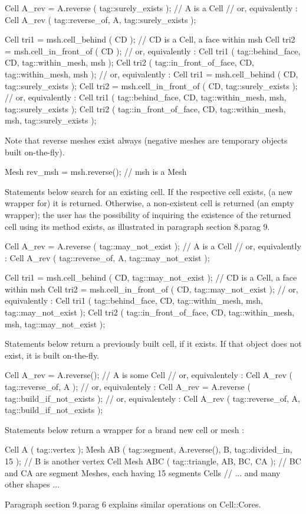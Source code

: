 \verbatim
   Cell A_rev = A.reverse ( tag::surely_exists );  //  A is a Cell
   // or, equivalently :
   Cell A_rev ( tag::reverse_of, A, tag::surely_exists );

   Cell tri1 = msh.cell_behind ( CD );  //  CD is a Cell, a face within msh
   Cell tri2 = msh.cell_in_front_of ( CD );
   // or, equivalently :
   Cell tri1 ( tag::behind_face, CD, tag::within_mesh, msh );
   Cell tri2 ( tag::in_front_of_face, CD, tag::within_mesh, msh );
   // or, equivalently :
   Cell tri1 = msh.cell_behind ( CD, tag::surely_exists );
   Cell tri2 = msh.cell_in_front_of ( CD, tag::surely_exists );
   // or, equivalently :
   Cell tri1 ( tag::behind_face, CD, tag::within_mesh, msh, tag::surely_exists );
   Cell tri2 ( tag::in_front_of_face, CD,
               tag::within_mesh, msh, tag::surely_exists );
\endverbatim

Note that reverse meshes exist always (negative meshes are temporary objects built
on-the-fly).

\verbatim
   Mesh rev_msh = msh.reverse();  // msh is a Mesh
\endverbatim

Statements below search for an existing cell.
If the respective cell exists, (a new wrapper for) it is returned.
Otherwise, a non-existent cell is returned
(an empty wrapper); the user has the possibility of inquiring the existence
of the returned cell using its method {\codett exists}, as illustrated in paragraph
\numb section 8.\numb parag 9.

\verbatim
   Cell A_rev = A.reverse ( tag::may_not_exist );  //  A is a Cell
   // or, equivalently :
   Cell A_rev ( tag::reverse_of, A, tag::may_not_exist );
   
   Cell tri1 = msh.cell_behind ( CD, tag::may_not_exist );
   //  CD is a Cell, a face within msh
   Cell tri2 = msh.cell_in_front_of ( CD, tag::may_not_exist );
   // or, equivalently :
   Cell tri1 ( tag::behind_face, CD, tag::within_mesh, msh, tag::may_not_exist );
   Cell tri2
      ( tag::in_front_of_face, CD, tag::within_mesh, msh, tag::may_not_exist );
\endverbatim

Statements below return a previously built cell, if it exists.
If that object does not exist, it is built on-the-fly.

\verbatim
   Cell A_rev = A.reverse();  // A is some Cell
   // or, equivalentely :
   Cell A_rev ( tag::reverse_of, A );
   // or, equivalentely :
   Cell A_rev = A.reverse ( tag::build_if_not_exists );
   // or, equivalentely :
   Cell A_rev ( tag::reverse_of, A, tag::build_if_not_exists );
\endverbatim

Statements below return a wrapper for a brand new cell or mesh :

\verbatim
   Cell A ( tag::vertex );
   Mesh AB ( tag::segment, A.reverse(), B, tag::divided_in, 15 );
   // B is another vertex Cell
   Mesh ABC ( tag::triangle, AB, BC, CA );
   //  BC and CA are segment Meshes, each having 15 segments Cells
   // ... and many other shapes ...
\endverbatim

Paragraph \numb section 9.\numb parag 6 explains similar operations on {\codett Cell::Core}s.
